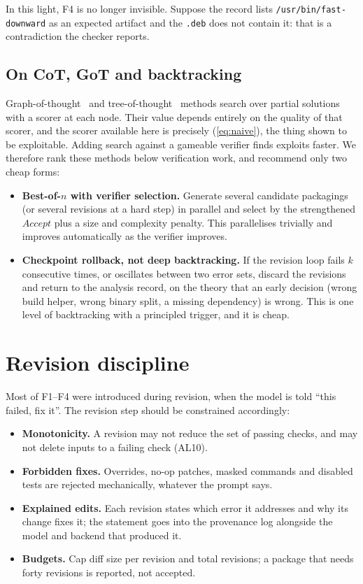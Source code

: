\documentclass[11pt]{article}
\newcommand{\file}[1]{\texttt{#1}}
\begin{document}
In this light, F4 is no longer invisible. Suppose the record lists
\file{/usr/bin/fast-downward} as an expected artifact and the \file{.deb}
does not contain it: that is a contradiction the checker reports.

\subsection{On CoT, GoT and backtracking}

Graph-of-thought~\cite{got} and tree-of-thought~\cite{tot} methods search
over partial solutions with a scorer at each node. Their value depends
entirely on the quality of that scorer, and the scorer available here is
precisely (\ref{eq:naive}), the thing shown to be exploitable. Adding
search against a gameable verifier finds exploits faster. We therefore rank
these methods below verification work, and recommend only two cheap forms:

\begin{itemize}[leftmargin=1.5em]
\item \textbf{Best-of-$n$ with verifier selection.} Generate several
  candidate packagings (or several revisions at a hard step) in parallel and
  select by the strengthened $\mathit{Accept}$ plus a size and complexity
  penalty. This parallelises trivially and improves automatically as the
  verifier improves.
\item \textbf{Checkpoint rollback, not deep backtracking.} If the revision
  loop fails $k$ consecutive times, or oscillates between two error sets,
  discard the revisions and return to the analysis record, on the theory
  that an early decision (wrong build helper, wrong binary split, a missing
  dependency) is wrong. This is one level of backtracking with a principled
  trigger, and it is cheap.
\end{itemize}

\section{Revision discipline}

Most of F1--F4 were introduced during revision, when the model is told
``this failed, fix it''. The revision step should be constrained
accordingly:

\begin{itemize}[leftmargin=1.5em]
\item \textbf{Monotonicity.} A revision may not reduce the set of passing
  checks, and may not delete inputs to a failing check (AL10).
\item \textbf{Forbidden fixes.} Overrides, no-op patches, masked commands and
  disabled tests are rejected mechanically, whatever the prompt says.
\item \textbf{Explained edits.} Each revision states which error it
  addresses and why its change fixes it; the statement goes into the
  provenance log alongside the model and backend that produced it.
\item \textbf{Budgets.} Cap diff size per revision and total revisions; a
  package that needs forty revisions is reported, not accepted.
\end{itemize}
\end{document}
